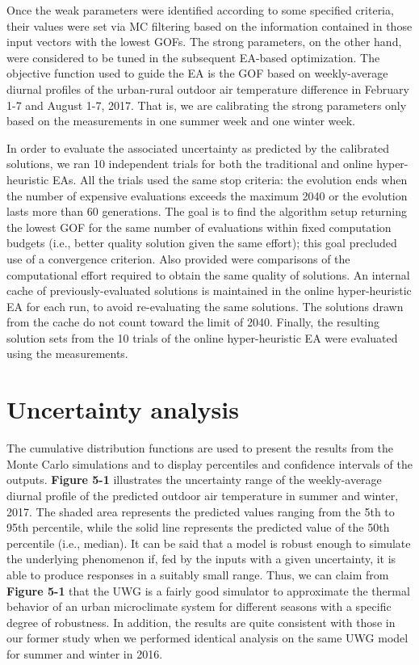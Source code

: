 Once the weak parameters were identified according to some specified criteria, their values were set via MC filtering based on the information contained in those input vectors with the lowest GOFs. The strong parameters, on the other hand, were considered to be tuned in the subsequent EA-based optimization. The objective function used to guide the EA is the GOF based on weekly-average diurnal profiles of the urban-rural outdoor air temperature difference in February 1-7 and August 1-7, 2017. That is, we are calibrating the strong parameters only based on the measurements in one summer week and one winter week.

In order to evaluate the associated uncertainty as predicted by the calibrated solutions, we ran 10 independent trials for both the traditional and online hyper-heuristic EAs. All the trials used the same stop criteria: the evolution ends when the number of expensive evaluations exceeds the maximum 2040 or the evolution lasts more than 60 generations. The goal is to find the algorithm setup returning the lowest GOF for the same number of evaluations within fixed computation budgets (i.e., better quality solution given the same effort); this goal precluded use of a convergence criterion. Also provided were comparisons of the computational effort required to obtain the same quality of solutions. An internal cache of previously-evaluated solutions is maintained in the online hyper-heuristic EA for each run, to avoid re-evaluating the same solutions. The solutions drawn from the cache do not count toward the limit of 2040. Finally, the resulting solution sets from the 10 trials of the online hyper-heuristic EA were evaluated using the measurements.

\section{Uncertainty analysis}

The cumulative distribution functions are used to present the results from the Monte Carlo simulations and to display percentiles and confidence intervals of the outputs. \textbf{Figure 5-1} illustrates the uncertainty range of the weekly-average diurnal profile of the predicted outdoor air temperature in summer and winter, 2017. The shaded area represents the predicted values ranging from the 5th to 95th percentile, while the solid line represents the predicted value of the 50th percentile (i.e., median). It can be said that a model is robust enough to simulate the underlying phenomenon if, fed by the inputs with a given uncertainty, it is able to produce responses in a suitably small range. Thus, we can claim from \textbf{Figure 5-1} that the UWG is a fairly good simulator to approximate the thermal behavior of an urban microclimate system for different seasons with a specific degree of robustness. In addition, the results are quite consistent with those in our former study \cite{mao2017global} when we performed identical analysis on the same UWG model for summer and winter in 2016.

